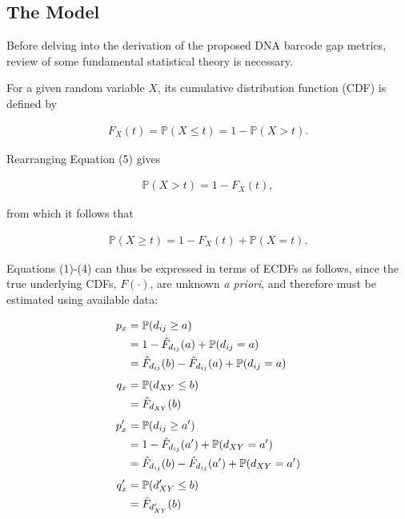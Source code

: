 \documentclass[12pt]{article}
\begin{document}
\subsection{The Model}

Before delving into the derivation of the proposed DNA barcode gap metrics, review of some fundamental statistical theory is necessary.

For a given random variable $X$, its cumulative distribution function (CDF) is defined by

\begin{align}
F_X(t) = \mathbb{P}(X \leq t) = 1 - \mathbb{P}(X > t). 
\end{align}

\noindent Rearranging Equation (5) gives

\begin{align}
\mathbb{P}(X > t) = 1 - F_X(t),
\end{align}

\noindent from which it follows that

\begin{align}
\mathbb{P}(X \geq t) = 1 - F_X(t) + \mathbb{P}(X = t).
\end{align}

Equations (1)-(4) can thus be expressed in terms of ECDFs as follows, since the true underlying CDFs, $F(\cdot)$, are unknown \textit{a priori}, and therefore must be estimated using available data:

\begin{align}
p_x  &= \mathbb{P}(d_{ij} \geq a) \notag \\
     &= 1 - \hat{F}_{d_{ij}}(a) + \mathbb{P}(d_{ij} = a) \notag \\
     &= \hat{F}_{d_{ij}}(b) - \hat{F}_{d_{ij}}(a) +  \mathbb{P}(d_{ij} = a) \\[1ex]
q_x  &=  \mathbb{P}(d_{XY} \leq b) \notag \\
     &= \hat{F}_{d_{XY}}(b) \\[1ex]
p'_x &=  \mathbb{P}(d_{ij} \geq a') \notag \\
     &= 1 - \hat{F}_{d_{ij}}(a') +  \mathbb{P}(d_{XY} = a') \notag \\
     &= \hat{F}_{d_{ij}}(b) - \hat{F}_{d_{ij}}(a') +  \mathbb{P}(d_{XY} = a')  \\[1ex]
q'_x &=  \mathbb{P}(d'_{XY} \leq b) \notag \\
     &= \hat{F}_{d'_{XY}}(b)
\end{align}
\end{document}

